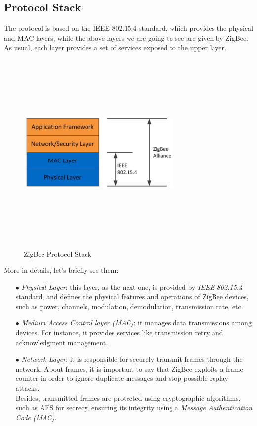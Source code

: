 \documentclass[12pt]{report}
\begin{document}
{\clearpage
\subsection{Protocol Stack}
\bigskip

The protocol is based on the IEEE 802.15.4 standard, which provides the physical and MAC layers, while the above layers we are going to see are given by ZigBee.
As usual, each layer provides a set of services exposed to the upper layer.\\

\begin{figure}[H]
\includegraphics[width=8cm,height=10cm,keepaspectratio]{zigbee_protocol_stack}
\centering
\caption{ZigBee Protocol Stack}
\end{figure}

More in details, let's briefly see them: 

\begin{itemize}
\setlength{\itemindent}{+4mm}
\item[$\bullet$] \emph{Physical Layer}: this layer, as the next one, is provided by \emph{IEEE 802.15.4} standard, and defines the physical features and operations of ZigBee devices, such as power, channels, modulation, demodulation, transmission rate, etc.
\item[$\bullet$] \emph{Medium Access Control layer (MAC)}: it manages data transmissions among devices. For instance, it provides services like transmission retry and acknowledgment management.
\item[$\bullet$] \emph{Network Layer}: it is responsible for securely transmit frames through the network. 
About frames, it is important to say that ZigBee exploits a frame counter in order to ignore duplicate messages and stop possible replay attacks.\\Besides, transmitted frames are protected using cryptographic algorithms, such as AES for secrecy, ensuring its integrity using a \emph{Message Authentication Code (MAC)}.


\end{itemize}}
\end{document}
